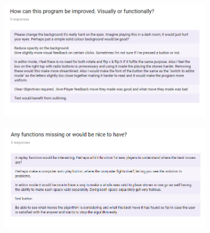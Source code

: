 \documentclass{l4proj}
\begin{document}
\begin{appendices}
\begin{figure}[H]
\centering
\begin{subfigure}[b]{\textwidth}
\centering
\includegraphics[width=\textwidth]{A1-2/5.png}
\end{subfigure}
\end{figure}



\begin{figure}[H]
\centering
\begin{subfigure}[b]{\textwidth}
\centering
\includegraphics[width=\textwidth]{A1-2/6.png}
\end{subfigure}
\end{figure}




\end{appendices}







\end{document}
